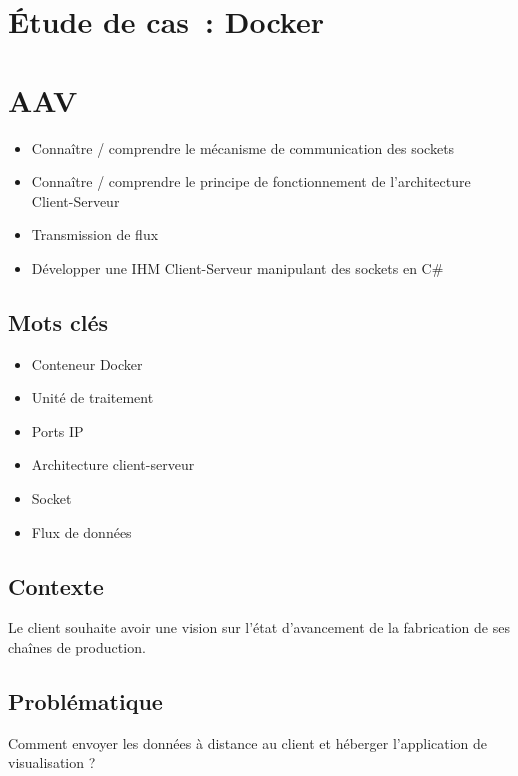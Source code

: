\newpage
\section*{Étude de cas~: Docker}

\section*{AAV}
\begin{itemize}
	\item [2] Connaître / comprendre le mécanisme de communication des sockets
	\item [2] Connaître / comprendre le principe de fonctionnement de l'architecture Client-Serveur
	\item [5] Transmission de flux
	\item [5] Développer une IHM Client-Serveur manipulant des sockets en C\#
\end{itemize}

\newpage

\subsection*{Mots clés}
{}
\begin{itemize}
	\item Conteneur Docker
	\item Unité de traitement
	\item Ports IP
	\item Architecture client-serveur
	\item Socket
	\item Flux de données
\end{itemize}

\subsection*{Contexte}
{}
\noindent Le client souhaite avoir une vision sur l'état d'avancement de la fabrication de ses chaînes de production. 

\subsection*{Problématique}
{}
\noindent Comment envoyer les données à distance au client et héberger l'application de visualisation ?

